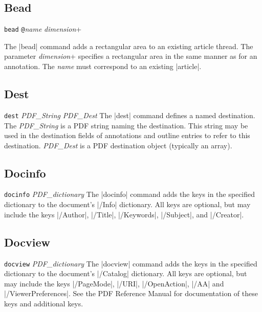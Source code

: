 {\subsection{Bead}
\syntax
{\tt bead} {\tt @}{\it name} {\it dimension}+

\description
The |bead| command adds a rectangular area to an existing article thread.
The parameter {\it dimension}+ specifies a rectangular area
in the same manner as for an annotation.  The {\it name}
must correspond to an existing |article|.
\example
\begintt
{}
\endtt

\subsection{Dest}
\syntax
{\tt dest} {\it PDF\_String} {\it PDF\_Dest}
\description
The |dest| command defines a named destination.
The {\it PDF\_String} is a PDF string naming
the destination.  This string may be used in the destination
fields of annotations and outline entries to refer to
this destination.  {\it PDF\_Dest} is a PDF
destination object (typically an array).
\example
\begintt
{}
\endtt

\subsection{Docinfo}
\syntax
{\tt docinfo} {\it PDF\_dictionary}
\description
The |docinfo| command adds the keys in the specified dictionary to the
document's |/Info| dictionary.  All keys are optional, but may include
the keys |/Author|, |/Title|, |/Keywords|, |/Subject|,
and |/Creator|.
\example
\begintt
{}
\endtt

\subsection{Docview}
\syntax
{\tt docview} {\it PDF\_dictionary}
\description
The |docview| command adds the keys in the specified dictionary to the
document's |/Catalog| dictionary.  All keys are optional, but may include
the keys |/PageMode|,
|/URI|, |/OpenAction|, |/AA|
and |/ViewerPreferences|.  See the PDF Reference Manual
for documentation of these keys and additional keys.
\example
\begintt
{}
\endtt


}
